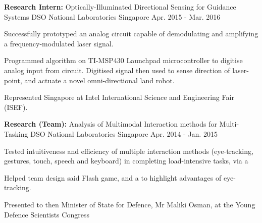 \begin{cventries}
\cventry
{\textbf{Research Intern:} Optically-Illuminated Directional Sensing for Guidance Systems 
} %
{DSO National Laboratories} %
{Singapore} %
{Apr. 2015 - Mar. 2016} %
{ %
\begin{cvitems}
	\item { Successfully prototyped an analog circuit capable of demodulating and amplifying a frequency-modulated laser signal. }
	\item { Programmed algorithm on TI-MSP430 Launchpad microcontroller to digitise analog input from circuit. \newline Digitised signal then used to sense direction of laser-point, and actuate a novel omni-directional land robot.}
	\item { Represented Singapore at Intel International Science and Engineering Fair (ISEF). }
\end{cvitems}
}


\label{eyeTrackingProject}

\cventry
{\textbf{Research (Team):} Analysis of Multimodal Interaction methods for Multi-Tasking 
} %
{DSO National Laboratories} %
{Singapore} %
{Apr. 2014 - Jan. 2015} %
{ %
	\begin{cvitems}
		\item { Tested intuitiveness and efficiency of multiple interaction methods (eye-tracking, gestures, touch, speech and keyboard) in completing load-intensive tasks, via a }
		\item { Helped team design said Flash game, and a  to highlight advantages of eye-tracking. }
		\item { Presented to then Minister of State for Defence, Mr Maliki Osman, at the Young Defence Scientists Congress }
	\end{cvitems}
}


\end{cventries}